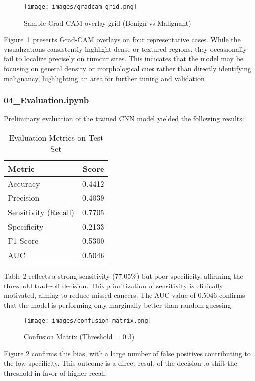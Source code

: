 \documentclass[12pt]{article}
\begin{document}
\begin{figure}[H]
\centering
\texttt{[image: images/gradcam\_grid.png]}
\caption{Sample Grad-CAM overlay grid (Benign vs Malignant)}
\label{fig:gradcam_grid}
\end{figure}

Figure~\ref{fig:gradcam_grid} presents Grad-CAM overlays on four representative cases. While the visualizations consistently highlight dense or textured regions, they occasionally fail to localize precisely on tumour sites. This indicates that the model may be focusing on general density or morphological cues rather than directly identifying malignancy, highlighting an area for further tuning and validation.

\subsubsection{04\_Evaluation.ipynb}
Preliminary evaluation of the trained CNN model yielded the following results:

\begin{table}[H]
\centering
\caption{Evaluation Metrics on Test Set}
\begin{tabular}{lr}
\toprule
Metric & Score \\
\midrule
Accuracy & 0.4412 \\
Precision & 0.4039 \\
Sensitivity (Recall) & 0.7705 \\
Specificity & 0.2133 \\
F1-Score & 0.5300 \\
AUC & 0.5046 \\
\bottomrule
\end{tabular}
\end{table}

Table 2 reflects a strong sensitivity (77.05\%) but poor specificity, affirming the threshold trade-off decision. This prioritization of sensitivity is clinically motivated, aiming to reduce missed cancers. The AUC value of 0.5046 confirms that the model is performing only marginally better than random guessing.

\begin{figure}[H]
\centering
\texttt{[image: images/confusion\_matrix.png]}
\caption{Confusion Matrix (Threshold = 0.3)}
\end{figure}
Figure 2 confirms this bias, with a large number of false positives contributing to the low specificity. This outcome is a direct result of the decision to shift the threshold in favor of higher recall.
\end{document}
